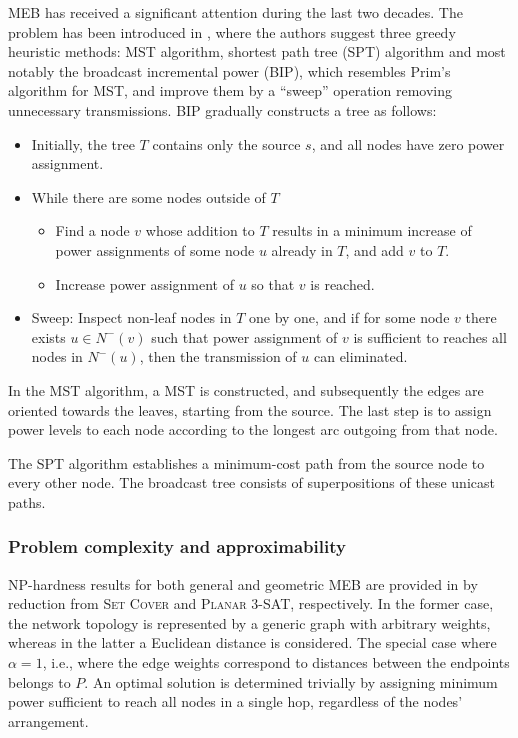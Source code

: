 MEB has received a significant attention during the last two decades.
The problem has been introduced in \cite{wieselthier00}, where the authors suggest three greedy heuristic methods:
MST algorithm, shortest path tree (SPT) algorithm and most notably the broadcast incremental power (BIP), which resembles Prim's algorithm for MST,
and improve them by a ``sweep'' operation removing unnecessary transmissions.
BIP gradually constructs a tree as follows:
\begin{itemize}
\item Initially, the tree $T$ contains only the source $s$, and all nodes have zero power assignment.
\item While there are some nodes outside of $T$
\begin{itemize}
	\item Find a node $v$ whose addition to $T$ results in a minimum increase of power assignments of some node $u$ already in $T$, and add $v$ to $T$.
	\item Increase  power assignment of $u$ so that $v$ is reached.
\end{itemize}
\item Sweep: Inspect non-leaf nodes in $T$ one by one, and if for some node $v$ there exists $u\in N^-(v)$ such that power assignment of $v$ is sufficient to reaches all nodes in $N^-(u)$, 
then the transmission of $u$ can eliminated.
\end{itemize}

In the MST algorithm, a MST is constructed, and subsequently the edges are oriented towards the leaves, starting from the source.
The last step is to assign power levels to each node according to the longest arc outgoing from that node.

The SPT algorithm establishes a minimum-cost path from the source node to every other node. The broadcast tree consists of superpositions of these unicast paths.

\subsubsection{Problem complexity and approximability}

NP-hardness results for both general and geometric MEB are provided in \cite{cagalj02} by reduction from \textsc{Set Cover} and \textsc{Planar 3-SAT}, respectively.
In the former case, the network topology is represented by a generic graph with arbitrary weights, whereas in the latter a Euclidean distance is considered.
The special case where $\alpha=1$, i.e., where the edge weights correspond to distances between the endpoints belongs to $P$.
An optimal solution is determined trivially by assigning minimum power sufficient to reach all nodes in a single hop, regardless of the nodes' arrangement.

